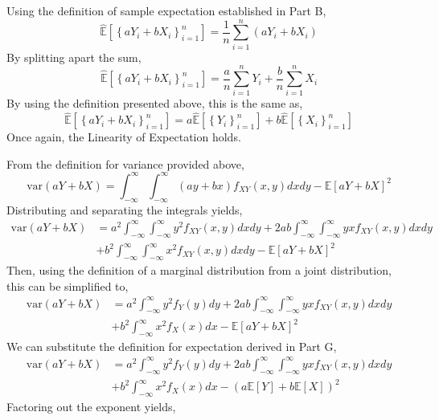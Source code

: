 \documentclass[12pt,twoside]{article}
\begin{document}
\begin{problems}
\begin{problemparts}
\problempart %

Using the definition of sample expectation established in Part B,
$$ \hat{\mathbb{E}}\left[\left\{a Y_i + b X_i \right\}_{i = 1}^n \right] = \frac{1}
{n} \sum_{i = 1}^n \left(a Y_i + b X_i\right) $$
By splitting apart the sum,
$$ \hat{\mathbb{E}}\left[\left\{a Y_i + b X_i \right\}_{i = 1}^n \right] =
\frac{a}{n} \sum_{i = 1}^n Y_i + \frac{b}{n} \sum_{i = 1}^n X_i $$
By using the definition presented above, this is the same as,
$$ \boxed{\hat{\mathbb{E}}\left[\left\{a Y_i + b X_i \right\}_{i = 1}^n \right] = a
\hat{\mathbb{E}}\left[\left\{Y_i\right\}_{i = 1}^n \right] + b
\hat{\mathbb{E}}\left[\left\{X_i\right\}_{i = 1}^n \right]} $$
Once again, the Linearity of Expectation holds.

\problempart %

From the definition for variance provided above,
$$ \mathrm{var}(a Y + b X) = \int_{-\infty}^{\infty} \int_{-\infty}^{\infty} (a y
+ b x) f_{XY}(x, y) dx dy - \mathbb{E}[aY + bX]^2 $$
Distributing and separating the integrals yields,
\begin{align*}
    \mathrm{var}(aY + bX) &= a^2 \int_{-\infty}^{\infty} \int_{-\infty}^{\infty} 
    y^2 f_{XY}(x, y) dx dy + 2ab \int_{-\infty}^{\infty}\int_{-\infty}^{\infty} yx
    f_{XY}(x, y) dx dy \\
    &+ b^2 \int_{-\infty}^{\infty}\int_{-\infty}^{\infty} x^2 f_{XY}(x, y) dx dy -
    \mathbb{E}[aY + bX]^2
\end{align*}
Then, using the definition of a marginal distribution from a joint distribution,
this can be simplified to,
\begin{align*}
    \mathrm{var}(aY + bX) &= a^2 \int_{-\infty}^{\infty} y^2 f_{Y}(y) dy + 2ab
    \int_{-\infty}^{\infty}\int_{-\infty}^{\infty} yx f_{XY}(x, y) dx dy \\
    &+ b^2 \int_{-\infty}^{\infty} x^2 f_{X}(x) dx - \mathbb{E}[aY + bX]^2
\end{align*}
We can substitute the definition for expectation derived in Part G,
\begin{align*}
    \mathrm{var}(aY + bX) &= a^2 \int_{-\infty}^{\infty} y^2 f_{Y}(y) dy + 2ab
    \int_{-\infty}^{\infty}\int_{-\infty}^{\infty} yx f_{XY}(x, y) dx dy \\
    &+ b^2 \int_{-\infty}^{\infty} x^2 f_{X}(x) dx - \left(a \mathbb{E}[Y] + b 
    \mathbb{E}[X]\right)^2
\end{align*}
Factoring out the exponent yields,
\begin{align*}

\end{align*}
\end{problemparts}
\end{problems}
\end{document}

